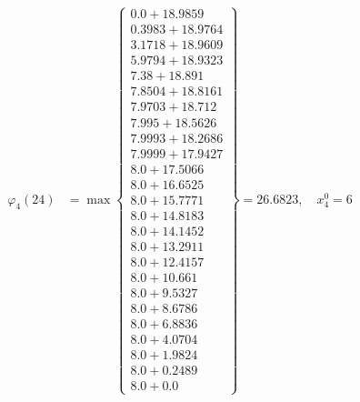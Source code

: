 \documentclass{article}
\begin{document}
\begin{align*}
\varphi_{4}(24) &= \max \left\{ \begin{array}{c}
0.0 + 18.9859 \\
 0.3983 + 18.9764 \\
 3.1718 + 18.9609 \\
 5.9794 + 18.9323 \\
 7.38 + 18.891 \\
 7.8504 + 18.8161 \\
 7.9703 + 18.712 \\
 7.995 + 18.5626 \\
 7.9993 + 18.2686 \\
 7.9999 + 17.9427 \\
 8.0 + 17.5066 \\
 8.0 + 16.6525 \\
 8.0 + 15.7771 \\
 8.0 + 14.8183 \\
 8.0 + 14.1452 \\
 8.0 + 13.2911 \\
 8.0 + 12.4157 \\
 8.0 + 10.661 \\
 8.0 + 9.5327 \\
 8.0 + 8.6786 \\
 8.0 + 6.8836 \\
 8.0 + 4.0704 \\
 8.0 + 1.9824 \\
 8.0 + 0.2489 \\
 8.0 + 0.0
\end{array} \right\}=26.6823, \quad x_{4}^0=6\\
  

\end{align*}
\end{document}
